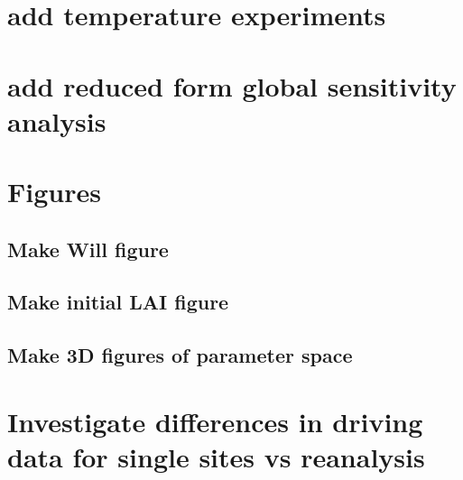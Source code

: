 \documentclass{article}
\begin{document}
\section{add temperature experiments}

\section{add reduced form global sensitivity analysis}

 \section{Figures}
 \subsection{Make Will figure}
 \subsection{Make initial LAI figure}
 \subsection{Make 3D figures of parameter space}
 
 

\section{Investigate differences in driving data for single sites vs reanalysis}
\end{document}
